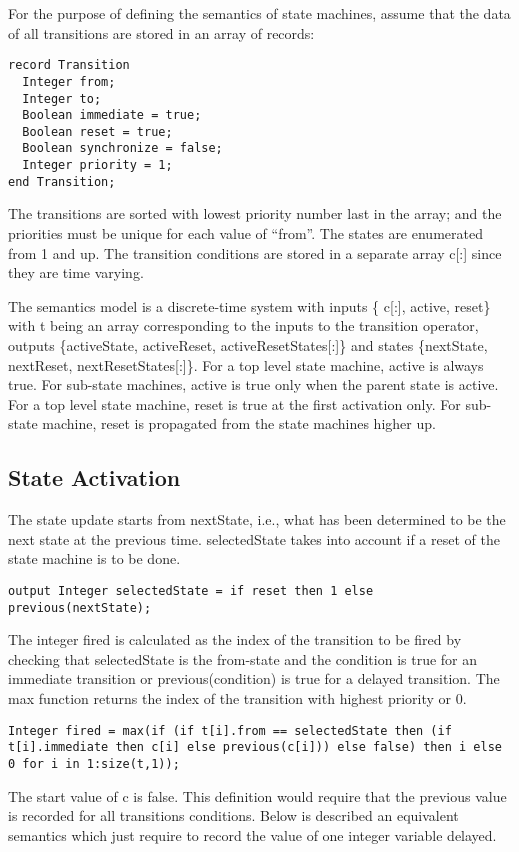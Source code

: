 For the purpose of defining the semantics of state machines, assume that
the data of all transitions are stored in an array of records:

\begin{lstlisting}[language=modelica]
record Transition
  Integer from;
  Integer to;
  Boolean immediate = true;
  Boolean reset = true;
  Boolean synchronize = false;
  Integer priority = 1;
end Transition;
\end{lstlisting}

The transitions are sorted with lowest priority number last in the
array; and the priorities must be unique for each value of ``from''. The
states are enumerated from 1 and up. The transition conditions are
stored in a separate array c{[}:{]} since they are time varying.

  The semantics model is a discrete-time system with inputs \{ c{[}:{]},
  active, reset\} with t being an array corresponding to the inputs to the
  transition operator, outputs \{activeState, activeReset,
  activeResetStates{[}:{]}\} and states \{nextState, nextReset,
  nextResetStates{[}:{]}\}. For a top level state machine, active is
  always true. For sub-state machines, active is true only when the parent
  state is active. For a top level state machine, reset is true at the
  first activation only. For sub-state machine, reset is propagated from
the state machines higher up.

\subsection{State Activation}

The state update starts from nextState, i.e., what has been determined
to be the next state at the previous time. selectedState takes into
account if a reset of the state machine is to be done.

\begin{lstlisting}[language=modelica]
  output Integer selectedState = if reset then 1 else previous(nextState);
\end{lstlisting}
The integer fired is calculated as the index of the transition to be
fired by checking that selectedState is the from-state and the condition
is true for an immediate transition or previous(condition) is true for a
delayed transition. The max function returns the index of the transition
with highest priority or 0.

\begin{lstlisting}[language=modelica]
  Integer fired = max(if (if t[i].from == selectedState then (if t[i].immediate then c[i] else previous(c[i])) else false) then i else 0 for i in 1:size(t,1));
\end{lstlisting}
The start value of c is false. This definition would require that the
previous value is recorded for all transitions conditions. Below is
described an equivalent semantics which just require to record the value
of one integer variable delayed.

